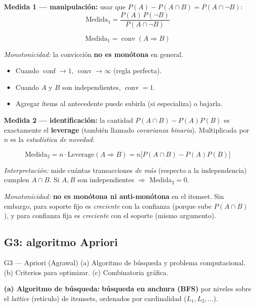 \documentclass[11pt,a4paper]{article}
\newcommand{\conf}{\operatorname{conf}}
\newcommand{\conv}{\operatorname{conv}}
\begin{document}
\textbf{Medida 1 — manipulación:} usar que $P(A) - P(A \cap B) = P(A \cap \neg B)$:
\[
\text{Medida}_1 = \frac{P(A)\,P(\neg B)}{P(A \cap \neg B)}
\]
\begin{formulabox}[Medida 1 = Convicción]
\[
\boxed{\;\text{Medida}_1 = \conv(A \Rightarrow B)\;}
\]
\end{formulabox}

\emph{Monotonicidad:} la convicción \textbf{no es monótona} en general.
\begin{itemize}
    \item Cuando $\conf \to 1$, $\conv \to \infty$ (regla perfecta).
    \item Cuando $A$ y $B$ son independientes, $\conv = 1$.
    \item Agregar ítems al antecedente puede subirla (si especializa) o bajarla.
\end{itemize}

\textbf{Medida 2 — identificación:} la cantidad $P(A \cap B) - P(A) P(B)$ es exactamente
el \textbf{leverage} (también llamado \emph{covarianza binaria}). Multiplicada por $n$
es la \emph{estadística de novedad}:
\begin{formulabox}[Medida 2 = Leverage $\times n$]
\[
\boxed{\;\text{Medida}_2 = n \cdot \text{Leverage}(A \Rightarrow B) = n\bigl[P(A \cap B) - P(A)P(B)\bigr]\;}
\]
\end{formulabox}

\emph{Interpretación:} mide cuántas transacciones \emph{de más} (respecto a la independencia)
cumplen $A \cap B$. Si $A, B$ son independientes $\Rightarrow$ Medida$_2 = 0$.

\emph{Monotonicidad:} \textbf{no es monótona ni anti-monótona} en el itemset. Sin embargo,
para soporte fijo es \emph{creciente} con la confianza (porque sube $P(A \cap B)$), y para
confianza fija es \emph{creciente} con el soporte (mismo argumento).

\subsection{G3: algoritmo Apriori}

\begin{ejerciciobox}{G3 — Apriori (Agrawal)}
(a) Algoritmo de búsqueda y problema computacional. (b) Criterios para optimizar. (c) Combinatoria gráfica.
\end{ejerciciobox}

\textbf{(a) Algoritmo de búsqueda:} \textbf{búsqueda en anchura (BFS)} por niveles sobre el
\emph{lattice} (retículo) de itemsets, ordenados por cardinalidad ($L_1, L_2, \ldots$).
\end{document}
